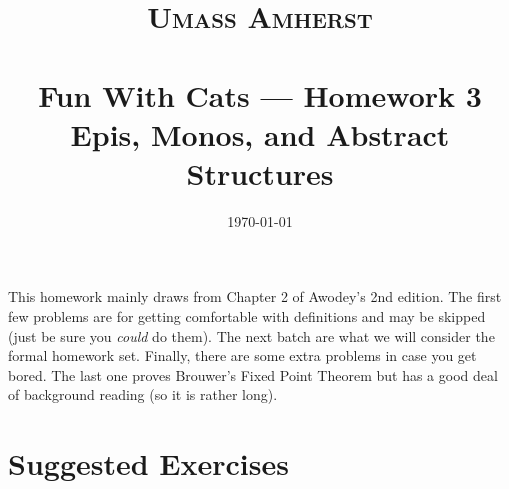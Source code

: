 %
%
%
%



\title{\normalfont\normalsize 
\textsc{Umass Amherst} \\ [10pt]%
\horrule{0.5pt} \\[0.4cm] %
\huge Fun With Cats --- Homework 3 \\
\normalsize Epis, Monos, and Abstract Structures
\horrule{2pt} \\[-0.8cm] %
}
\author{}
\date{\normalsize\today}

\maketitle

This homework mainly draws from Chapter 2 of Awodey's 2nd edition. The first few
problems are for getting comfortable with definitions and may be skipped (just
be sure you \textit{could} do them). The next batch are what we will consider
the formal homework set. Finally, there are some extra problems in case you get
bored. The last one proves Brouwer's Fixed Point Theorem but has a good deal of
background reading (so it is rather long).

\section{Suggested Exercises}

